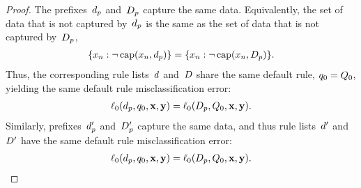 \begin{arxiv}
\begin{proof}
The prefixes~$d_p$ and~$D_p$ capture the same data.
%
Equivalently, the set of data that is not captured by~$d_p$
is the same as the set of data that is not captured by~$D_p$, \ie
\begin{align}
\{x_n : \neg\, \textnormal{cap}(x_n, d_p)\} = \{x_n : \neg\, \textnormal{cap}(x_n, D_p)\}.
\end{align}
Thus, the corresponding rule lists~${d}$ and~${D}$
share the same default rule, \ie ${q_0 = Q_0}$,
yielding the same default rule misclassification error:
\begin{align}
\ell_0(d_p, q_0, \mathbf{x}, \mathbf{y}) = \ell_0(D_p, Q_0, \mathbf{x}, \mathbf{y}).
\end{align}
Similarly, prefixes~$d_p'$ and~$D_p'$ capture
the same data, and thus rule lists~${d}'$ and~${D}'$
have the same default rule misclassification error:
\begin{align}
\ell_0(d_p, q_0, \mathbf{x}, \mathbf{y}) = \ell_0(D_p, Q_0, \mathbf{x}, \mathbf{y}).
\end{align}


\end{proof}
\end{arxiv}
